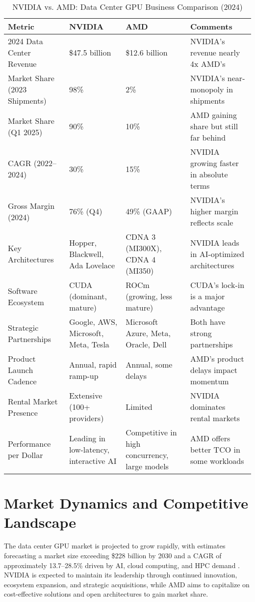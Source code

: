 \documentclass{article}
\begin{document}
\begin{table}[ht]
\centering
\caption{NVIDIA vs. AMD: Data Center GPU Business Comparison (2024)}
\label{tab:comparison}
\begin{tabularx}{\textwidth}{l X X X}
\toprule
Metric & NVIDIA & AMD & Comments \\
\midrule
2024 Data Center Revenue & \$47.5 billion & \$12.6 billion & NVIDIA's revenue nearly 4x AMD's \\
Market Share (2023 Shipments) & 98\% & 2\% & NVIDIA's near-monopoly in shipments \\
Market Share (Q1 2025) & 90\% & 10\% & AMD gaining share but still far behind \\
CAGR (2022--2024) & 30\% & 15\% & NVIDIA growing faster in absolute terms \\
Gross Margin (2024) & 76\% (Q4) & 49\% (GAAP) & NVIDIA's higher margin reflects scale \\
Key Architectures & Hopper, Blackwell, Ada Lovelace & CDNA 3 (MI300X), CDNA 4 (MI350) & NVIDIA leads in AI-optimized architectures \\
Software Ecosystem & CUDA (dominant, mature) & ROCm (growing, less mature) & CUDA's lock-in is a major advantage \\
Strategic Partnerships & Google, AWS, Microsoft, Meta, Tesla & Microsoft Azure, Meta, Oracle, Dell & Both have strong partnerships \\
Product Launch Cadence & Annual, rapid ramp-up & Annual, some delays & AMD's product delays impact momentum \\
Rental Market Presence & Extensive (100+ providers) & Limited & NVIDIA dominates rental markets \\
Performance per Dollar & Leading in low-latency, interactive AI & Competitive in high concurrency, large models & AMD offers better TCO in some workloads \\
\bottomrule
\end{tabularx}
\end{table}

\section{Market Dynamics and Competitive Landscape}

The data center GPU market is projected to grow rapidly, with estimates forecasting a market size exceeding \$228 billion by 2030 and a CAGR of approximately 13.7--28.5\% driven by AI, cloud computing, and HPC demand \cite{marketsandmarkets2030, grandview2030}. NVIDIA is expected to maintain its leadership through continued innovation, ecosystem expansion, and strategic acquisitions, while AMD aims to capitalize on cost-effective solutions and open architectures to gain market share.
\end{document}
